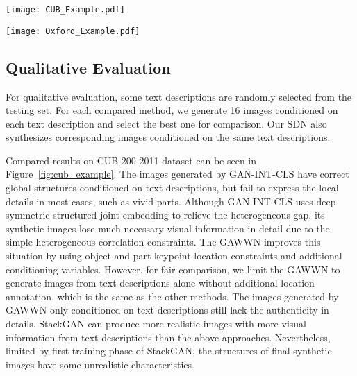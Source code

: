 \documentclass[sigconf]{acmart}
\begin{document}
\begin{figure*}
	\begin{center}
		\texttt{[image: CUB\_Example.pdf]}
	\end{center}
	\caption{Example results by our proposed SDN and compared methods on CUB-200-2011 testing set.}
	\label{fig:cub_example}
\end{figure*}

\begin{figure*}
	\begin{center}
		\texttt{[image: Oxford\_Example.pdf]}
	\end{center}
	\caption{Example results by our proposed SDN and compared methods on Oxford-Flower-102 testing set.}
	\label{fig:oxford_example}
\end{figure*}

\subsection{Qualitative Evaluation}

For qualitative evaluation, some text descriptions are randomly selected from the testing set. For each compared method, we generate 16 images conditioned on each text description and select the best one for comparison. Our SDN also synthesizes corresponding images conditioned on the same text descriptions.

Compared results on CUB-200-2011 dataset can be seen in Figure~\ref{fig:cub_example}. The images generated by GAN-INT-CLS have correct global structures conditioned on text descriptions, but fail to express the local details in most cases, such as vivid parts. Although GAN-INT-CLS uses deep symmetric structured joint embedding to relieve the heterogeneous gap, its synthetic images lose much necessary visual information in detail due to the simple heterogeneous correlation constraints. The GAWWN improves this situation by using object and part keypoint location constraints and additional conditioning variables. However, for fair comparison, we limit the GAWWN to generate images from text descriptions alone without additional location annotation, which is the same as the other methods. The images generated by GAWWN only conditioned on text descriptions still lack the authenticity in details. StackGAN can produce more realistic images with more visual information from text descriptions than the above approaches. Nevertheless, limited by first training phase of StackGAN, the structures of final synthetic images have some unrealistic characteristics. 	
\end{document}

